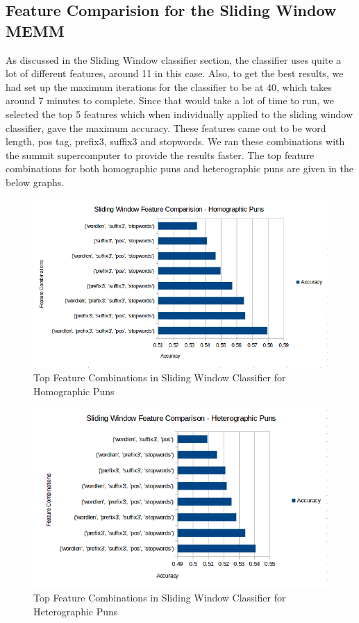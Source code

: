 \documentclass{article}
\begin{document}
\subsection{Feature Comparision for the Sliding Window MEMM}

As discussed in the Sliding Window classifier section, the classifier uses quite a lot of different features, around 11 in this case. Also, to get the best results, we had set up the maximum iterations for the classifier to be at 40, which takes around 7 minutes to complete. Since that would take a lot of time to run, we selected the top 5 features which when individually applied to the sliding window classifier, gave the maximum accuracy. These features came out to be word length, pos tag, prefix3, suffix3 and stopwords. We ran these combinations with the summit supercomputer to provide the results faster. The top feature combinations for both homographic puns and heterographic puns are given in the below graphs.

\begin{figure}[h!]
    \centering
    \includegraphics[width=120mm]{sliding_window_homographic.png}
    \caption{Top Feature Combinations in Sliding Window Classifier for Homographic Puns}
    \label{fig:method}
    \end{figure}

\begin{figure}[h!]
    \centering
    \includegraphics[width=120mm]{sliding_window_heterographic.png}
    \caption{Top Feature Combinations in Sliding Window Classifier for Heterographic Puns}
    \label{fig:method}
    \end{figure}
\end{document}
